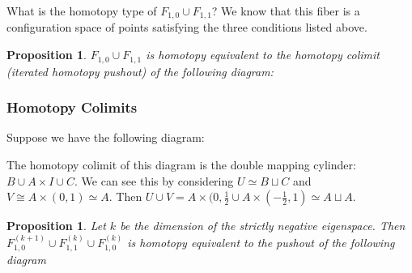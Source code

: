 \documentclass{article}
\newtheorem{proposition}[theorem]{Proposition}
\newtheorem{proposed work}[theorem]{Proposed Work}
\begin{document}
What is the homotopy type of $F_{1,0}\cup F_{1,1}$? We know that this fiber is a configuration space of points satisfying the three conditions listed above.\\

\begin{proposition}\label{F10_F11}
$F_{1,0}\cup F_{1,1}$ is homotopy equivalent to the homotopy colimit (iterated homotopy pushout) of the following diagram:\\
\begin{center}
	\end{center}
\end{proposition}

\subsubsection{Homotopy Colimits}
Suppose we have the following diagram:
\begin{center}
\end{center}

The homotopy colimit of this diagram is the double mapping cylinder: $B\cup A\times I \cup C$. We can see this by considering $U\simeq B\sqcup C$ and $V\cong A\times (0,1)\simeq A$. Then $U\cup V=A\times (0,\frac{1}{2}\cup A\times (-\frac{1}{2},1)\simeq A\sqcup A$.\\

\begin{proposition}
Let $k$ be the dimension of the strictly negative eigenspace. Then $F_{1,0}^{(k+1)}\cup F_{1,1}^{(k)}\cup F_{1,0}^{(k)}$ is homotopy equivalent to the pushout of the following diagram
	\begin{center}
	\end{center}
\end{proposition}
\end{document}
